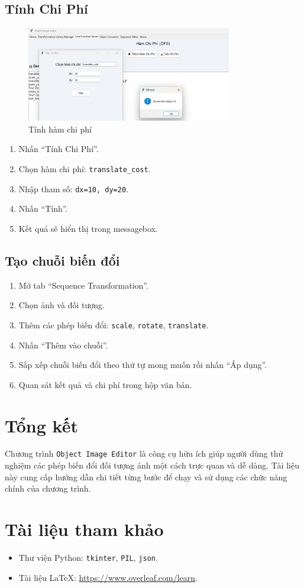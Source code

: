 \documentclass[a4paper,12pt]{article}
\begin{document}
\subsection{Tính Chi Phí}
\begin{figure}[H]
    \centering
    \includegraphics[width=0.8\textwidth]{eval.png}
    \caption{Tính hàm chi phí}
    \label{fig:tlm_tab}
    \end{figure}
\begin{enumerate}
    \item Nhấn “Tính Chi Phí”.
    \item Chọn hàm chi phí: \texttt{translate\_cost}.
    \item Nhập tham số: \texttt{dx=10, dy=20}.
    \item Nhấn “Tính”.
    \item Kết quả sẽ hiển thị trong messagebox.
    \end{enumerate}

\subsection{Tạo chuỗi biến đổi}
\begin{enumerate}
    \item Mở tab “Sequence Transformation”.
    \item Chọn ảnh và đối tượng.
    \item Thêm các phép biến đổi: \texttt{scale}, \texttt{rotate}, \texttt{translate}.
    \item Nhấn “Thêm vào chuỗi”.
    \item Sắp xếp chuỗi biến đổi theo thứ tự mong muốn rồi nhấn “Áp dụng”.
    \item Quan sát kết quả và chi phí trong hộp văn bản.
\end{enumerate}

\section{Tổng kết}
Chương trình \texttt{Object Image Editor} là công cụ hữu ích giúp người dùng thử nghiệm các phép biến đổi đối tượng ảnh một cách trực quan và dễ dàng. Tài liệu này cung cấp hướng dẫn chi tiết từng bước để chạy và sử dụng các chức năng chính của chương trình.

\section{Tài liệu tham khảo}
\begin{itemize}
    \item Thư viện Python: \texttt{tkinter}, \texttt{PIL}, \texttt{json}.
    \item Tài liệu LaTeX: \url{https://www.overleaf.com/learn}.
\end{itemize}
\end{document}

